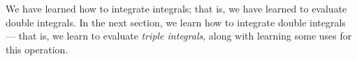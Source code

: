 We have learned how to integrate integrals; that is, we have learned to evaluate double integrals. In the next section, we learn how to integrate double integrals --- that is, we learn to evaluate \emph{triple integrals}, along with learning some uses for this operation.


